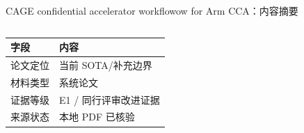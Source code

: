 \begin{frame}[t,shrink=6]{CAGE confidential accelerator workflowow for Arm CCA：内容摘要}
\begin{columns}[T,totalwidth=\textwidth]
\begin{column}{0.49\textwidth}
{\begin{minipage}[t]{0.97\linewidth}
\begin{minipage}{0.92\linewidth}
      \scriptsize {\tiny
\begin{tabularx}{\linewidth}{@{}YY@{}}
\toprule
\textbf{字段} & \textbf{内容} \\
\midrule
论文定位 & 当前 SOTA/补充边界 \\
材料类型 & 系统论文 \\
证据等级 & E1 / 同行评审改进证据 \\
来源状态 & 本地 PDF 已核验 \\
\bottomrule
\end{tabularx}
}
    \end{minipage}
    \vspace{1mm}
  \end{minipage}}
  \end{column}
\end{columns}
\end{frame}


